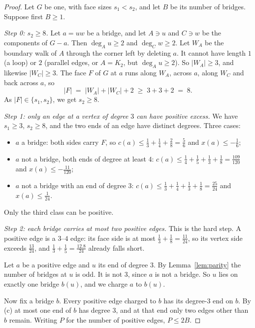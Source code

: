 \documentclass[11pt,a4paper]{amsart}
\theoremstyle{plain}
\theoremstyle{definition}
\begin{document}
\begin{proof}
Let $G$ be one, with face sizes $s_1 < s_2$, and let $B$ be its number of
bridges. Suppose first $B \ge 1$.

\smallskip
\emph{Step 0: $s_2 \ge 8$.} Let $a = uw$ be a bridge, and let $A \ni u$ and
$C \ni w$ be the components of $G - a$. Then $\deg_A u \ge 2$ and
$\deg_C w \ge 2$. Let $W_A$ be the boundary walk of $A$ through the corner left
by deleting $a$. It cannot have length $1$ (a loop) or $2$ (parallel edges, or
$A = K_2$, but $\deg_A u \ge 2$). So $|W_A| \ge 3$, and likewise
$|W_C| \ge 3$. The face $F$ of $G$ at $a$ runs along $W_A$, across $a$, along
$W_C$ and back across $a$, so
\[
  |F| \;=\; |W_A| + |W_C| + 2 \;\ge\; 3 + 3 + 2 \;=\; 8 .
\]
As $|F| \in \{s_1,s_2\}$, we get $s_2 \ge 8$.

\smallskip
\emph{Step 1: only an edge at a vertex of degree $3$ can have positive excess.}
We have $s_1 \ge 3$, $s_2 \ge 8$, and the two ends of an edge have distinct
degrees. Three cases:
\begin{itemize}
  \item $a$ a bridge: both sides carry $F$, so
        $c(a) \le \tfrac13+\tfrac14+\tfrac28 = \tfrac56$ and
        $x(a) \le -\tfrac16$;
  \item $a$ not a bridge, both ends of degree at least $4$:
        $c(a) \le \tfrac14+\tfrac15+\tfrac13+\tfrac18 = \tfrac{109}{120}$ and
        $x(a) \le -\tfrac{11}{120}$;
  \item $a$ not a bridge with an end of degree $3$:
        $c(a) \le \tfrac13+\tfrac14+\tfrac13+\tfrac18 = \tfrac{25}{24}$ and
        $x(a) \le \tfrac1{24}$.
\end{itemize}
Only the third class can be positive.

\smallskip
\emph{Step 2: each bridge carries at most two positive edges.} This is the hard
step. A positive edge is a $3$--$4$ edge: its face side is at most
$\tfrac13+\tfrac18 = \tfrac{11}{24}$, so its vertex side exceeds
$\tfrac{13}{24}$, and $\tfrac13+\tfrac15 = \tfrac{12.8}{24}$ already falls short.

Let $a$ be a positive edge and $u$ its end of degree $3$. By
Lemma~\ref{lem:parity} the number of bridges at $u$ is odd. It is not $3$,
since $a$ is not a bridge. So $u$ lies on exactly one bridge $b(u)$, and we
charge $a$ to $b(u)$.

Now fix a bridge $b$. Every positive edge charged to $b$ has its degree-$3$ end
on $b$. By (c) at most one end of $b$ has degree $3$, and at that end only two
edges other than $b$ remain. Writing $P$ for the number of positive edges,
$P \le 2B$.


\end{proof}
\end{document}
